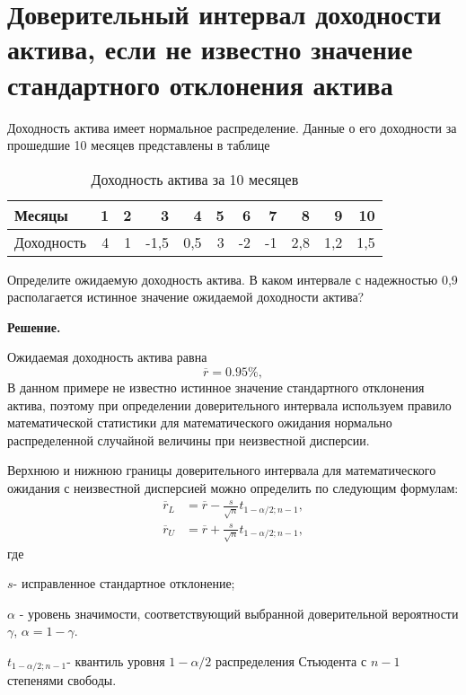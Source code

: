\documentclass[12pt,a4paper]{article}
\begin{document}
\section{Доверительный интервал доходности актива, если не известно значение стандартного отклонения актива}
\begin{taskrus}
Доходность актива имеет нормальное распределение. Данные о его доходности за прошедшие 10 месяцев представлены в таблице
\begin{table}[H]
  \centering
  \caption{Доходность актива за 10 месяцев}
    \begin{tabular}{lrrrrrrrrrr}
    \toprule
    Месяцы & 1     & 2     & 3     & 4     & 5     & 6     & 7     & 8     & 9     & 10 \\
    \midrule
    Доходность & 4     & 1     & -1,5  & 0,5   & 3     & -2    & -1    & 2,8   & 1,2   & 1,5 \\
    \bottomrule
    \end{tabular}%
  \label{tab:addlabel}%
\end{table}%
Определите ожидаемую доходность актива. В каком интервале с надежностью 0,9 располагается истинное значение ожидаемой доходности актива?

\textbf{Решение.}

Ожидаемая доходность актива равна
$$\overline{r}=0.95\%,$$
В данном примере не известно истинное значение стандартного отклонения актива, поэтому при определении доверительного интервала используем правило математической статистики для математического ожидания нормально распределенной случайной 
величины при неизвестной дисперсии.

Верхнюю и нижнюю границы доверительного интервала для математического ожидания с неизвестной дисперсией можно определить по следующим формулам:
\begin{align}
\label{yield_low_corrected}
\overline{r}_L &=\overline{r}-\frac{s}{\sqrt{n}}t_{1-\alpha/2;n-1},\\[8pt]
\label{yield_upper_corrected}
\overline{r}_U &=\overline{r}+\frac{s}{\sqrt{n}}t_{1-\alpha/2;n-1},
\end{align}
где

$s$- исправленное стандартное отклонение;

$\alpha$ - уровень значимости, соответствующий выбранной доверительной вероятности $\gamma$, $\alpha=1-\gamma$.

$t_{1-\alpha/2;n-1}$- квантиль уровня $1-\alpha/2$ распределения Стьюдента с $n-1$ степенями свободы.


\end{taskrus}
\end{document}
